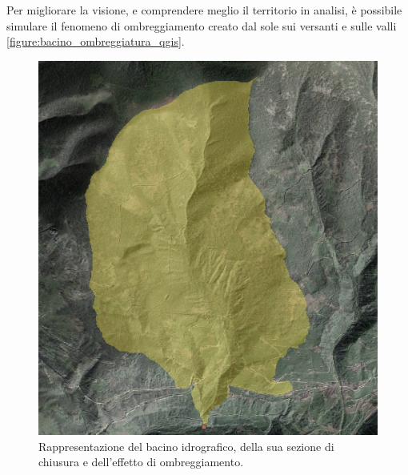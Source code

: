 Per migliorare la visione, e comprendere meglio il territorio in analisi, è possibile simulare il fenomeno di ombreggiamento creato dal sole sui versanti e sulle valli \eqref{figure:bacino_ombreggiatura_qgis}.
\begin{figure}[hbt]\centering
    \includegraphics[scale=.50]{immagini/bacino_ombreggiatura_qgis.PNG}
    \caption{Rappresentazione del bacino idrografico, della sua sezione di chiusura e dell'effetto di ombreggiamento.}
    \label{figure:bacino_ombreggiatura_qgis}
\end{figure}

